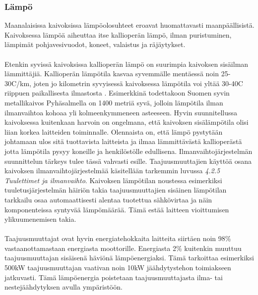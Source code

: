 \documentclass[finnish,12pt,a4paper,pdftex,elec,utf8]{aaltothesis}
\begin{document}
\subsubsection{Lämpö}
Maanalaisissa kaivoksissa lämpöolosuhteet eroavat huomattavasti maanpäällisistä. Kaivoksessa lämpöä aiheuttaa itse kallioperän lämpö, ilman puristuminen, lämpimät pohjavesivuodot, koneet, valaistus ja räjäytykset\cite[s.305]{Hakapää}. 
\\\\
Etenkin syvissä kaivoksissa kallioperän lämpö on suurimpia kaivoksen sisäilman lämmittäjiä. Kallioperän lämpötila kasvaa syvemmälle mentäessä noin 25-30\textdegree C/km, joten jo kilometrin syvyisessä kaivoksessa lämpötila voi yltää 30-40\textdegree C riippuen paikallisesta ilmastosta \cite[s. 62]{maanlampo}. %
Esimerkkinä todettakoon Suomen syvin metallikaivos Pyhäsalmella on 1400 metriä syvä, jolloin lämpötila ilman ilmanvaihtoa kohoaa yli kolmeenkymmeneen asteeseen. Hyvin suunnitellussa kaivoksessa kuitenkaan harvoin on ongelmana, että kaivoksen sisälämpötila olisi liian korkea laitteiden toiminnalle. Olennaista on, että lämpö pystytään johtamaan ulos sitä tuottavista laitteista ja ilmaa lämmittävästä kallioperästä jotta lämpötila pysyy koneille ja henkilöstölle edullisena. Ilmanvaihtojärjestelmän suunnittelun tärkeys tulee tässä vahvasti esille. Taajuusmuuttajien käyttöä osana kaivoksen ilmanvaihtojärjestelmää käsitellään tarkemmin luvussa \textit{4.2.5 Tuulettimet ja ilmanvaihto}. Kaivoksen lämpötilan noustessa esimerkiksi tuuletusjärjestelmän häiriön takia taajuusmuuttajien sisäinen lämpötilan tarkkailu osaa automaattisesti alentaa tuotettua sähkövirtaa ja näin komponenteissa syntyvää lämpömäärää. Tämä estää laitteen vioittumisen ylikuumenemisen takia.
\\\\
Taajuusmuuttajat ovat hyvin energiatehokkaita laitteita siirtäen noin 98\% vastaanottamastaan energiasta moottorille\cite{ABBinmining}. Energiasta 2\% kuitenkin muuttuu taajuusmuuttajan sisäisenä häviönä lämpöenergiaksi. Tämä tarkoittaa esimerkiksi 500kW taajuusmuuttajan vaativan noin 10kW jäähdytystehon toimiakseen jatkuvasti. Tämä lämpöenergia poistetaan taajuusmuuttajasta ilma- tai nestejäähdytyksen avulla ympäristöön.
 
\end{document}
